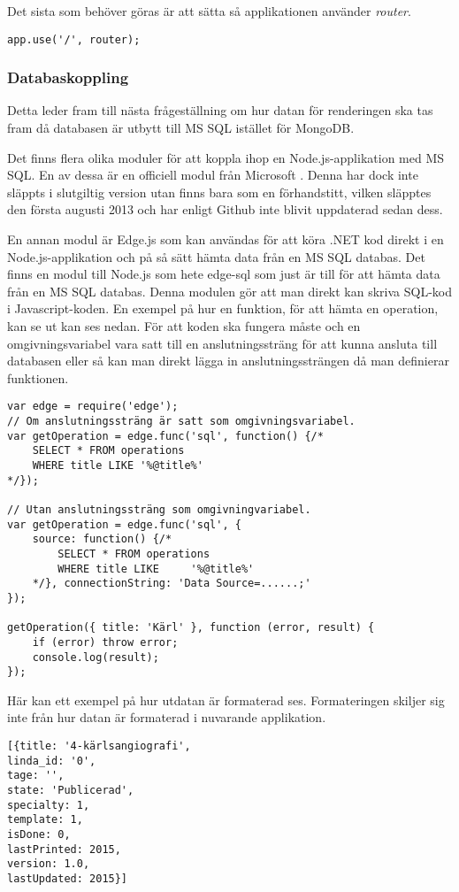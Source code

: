 Det sista som behöver göras är att sätta så applikationen använder \textit{router}.
\begin{verbatim}
app.use('/', router);
\end{verbatim}

\subsubsection{Databaskoppling}
Detta leder fram till nästa frågeställning om hur datan för renderingen ska tas fram då databasen är utbytt till MS SQL istället för MongoDB.

Det finns flera olika moduler för att koppla ihop en Node.js-applikation med MS SQL. En av dessa är en officiell modul från Microsoft \cite{sqlMS}. Denna har dock inte släppts i slutgiltig version utan finns bara som en förhandstitt, vilken släpptes den första augusti 2013 och har enligt Github inte blivit uppdaterad sedan dess.

En annan modul är Edge.js som kan användas för att köra .NET kod direkt i en Node.js-applikation och på så sätt hämta data från en MS SQL databas. Det finns en modul till Node.js som hete edge-sql som just är till för att hämta data från en MS SQL databas. Denna modulen gör att man direkt kan skriva SQL-kod i Javascript-koden. En exempel på hur en funktion, för att hämta en operation, kan se ut kan ses nedan. För att koden ska fungera måste och en omgivningsvariabel vara satt till en anslutningssträng för att kunna ansluta till databasen eller så kan man direkt lägga in anslutningssträngen då man definierar funktionen. 


\begin{verbatim}
var edge = require('edge');
// Om anslutningssträng är satt som omgivningsvariabel.
var getOperation = edge.func('sql', function() {/*
    SELECT * FROM operations
    WHERE title LIKE '%@title%'
*/});

// Utan anslutningssträng som omgivningvariabel.
var getOperation = edge.func('sql', {
    source: function() {/*
        SELECT * FROM operations
        WHERE title LIKE	 '%@title%'
	*/}, connectionString: 'Data Source=......;'
});

getOperation({ title: 'Kärl' }, function (error, result) {
    if (error) throw error;
    console.log(result);
});
\end{verbatim}
Här kan ett exempel på hur utdatan är formaterad ses. Formateringen skiljer sig inte från hur datan är formaterad i nuvarande applikation. 
\begin{verbatim}
[{title: '4-kärlsangiografi',
linda_id: '0',
tage: '',
state: 'Publicerad',
specialty: 1,
template: 1,
isDone: 0,
lastPrinted: 2015,
version: 1.0,
lastUpdated: 2015}]

\end{verbatim}

